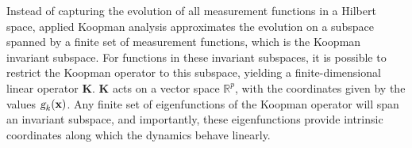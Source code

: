 Instead of capturing the evolution of all measurement functions in a Hilbert space, applied Koopman analysis approximates the evolution on a subspace spanned by a finite set of measurement functions, which is the Koopman invariant subspace. For functions in these invariant subspaces, it is possible to restrict the Koopman operator to this subspace, yielding a finite-dimensional linear operator $\mathbf{K}$. $\mathbf{K}$ acts on a vector space $\mathbb{R}^p$, with the coordinates given by the values $\textsl{g}_k(\mathbf{x})$. Any finite set of eigenfunctions of the Koopman operator will span an invariant subspace, and importantly, these eigenfunctions provide intrinsic coordinates along which the dynamics behave linearly.

